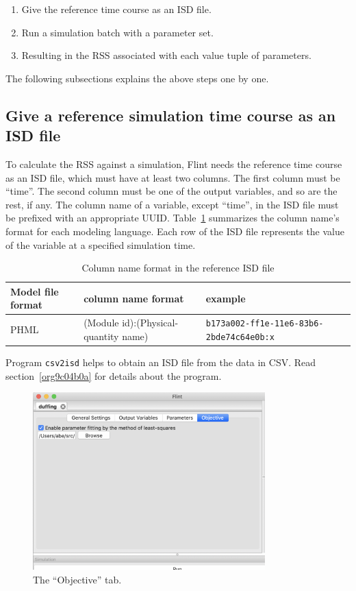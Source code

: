 \documentclass[a4paper,10pt]{report}
\begin{document}
\begin{enumerate}
\item Give the reference time course as an ISD file.
\item Run a simulation batch with a parameter set.
\item Resulting in the RSS associated with each value tuple of parameters.
\end{enumerate}

The following subsections explains the above steps one by one.

\subsection{Give a reference simulation time course  as an ISD file}
\label{sec:org48485ac}
To calculate the RSS against a simulation, Flint needs the reference time course
as an ISD file, which must have at least two columns.
The first column must be ``time''. The second column must be one of the output
variables, and so are the rest, if any.
The column name of a variable, except ``time'', in the ISD file must be prefixed
with an appropriate UUID.
Table~\ref{tab:org6c29582} summarizes the column name's format for each
modeling language.
Each row of the ISD file represents the value of the variable at a specified
simulation time.

\begin{table}[htbp]
\caption{\label{tab:org6c29582}Column name format in the reference ISD file}
\centering
\begin{tabular}{lll}
Model file format & column name format & example\\
\hline
PHML & (Module id):(Physical-quantity name) & \texttt{b173a002-ff1e-11e6-83b6-2bde74c64e0b:x}\\
\end{tabular}
\end{table}

Program \texttt{csv2isd} helps to obtain an ISD file from the data in CSV.
Read section~\ref{org9c04b0a} for details about the program.

\begin{figure}[htbp]
\centering
\includegraphics[width=0.8\textwidth]{image/parameter-fitting-objective.png}
\caption{\label{fig:org69820d1}The ``Objective'' tab.}
\end{figure}
\end{document}
